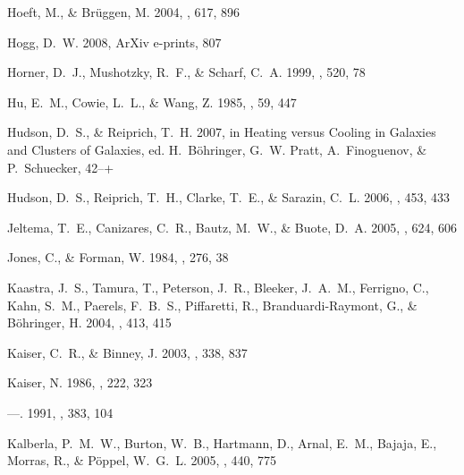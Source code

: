 \documentclass[12pt,preprint]{aastex}
\begin{document}
\begin{thebibliography}{137}
{Hoeft}, M., \& {Br{\"u}ggen}, M. 2004, \apj, 617, 896

{Hogg}, D.~W. 2008, ArXiv e-prints, 807

{Horner}, D.~J., {Mushotzky}, R.~F., \& {Scharf}, C.~A. 1999, \apj, 520, 78

{Hu}, E.~M., {Cowie}, L.~L., \& {Wang}, Z. 1985, \apjs, 59, 447

{Hudson}, D.~S., \& {Reiprich}, T.~H. 2007, in Heating versus Cooling in
  Galaxies and Clusters of Galaxies, ed. H.~{B{\"o}hringer}, G.~W. {Pratt},
  A.~{Finoguenov}, \& P.~{Schuecker}, 42--+

{Hudson}, D.~S., {Reiprich}, T.~H., {Clarke}, T.~E., \& {Sarazin}, C.~L. 2006,
  \aap, 453, 433

{Jeltema}, T.~E., {Canizares}, C.~R., {Bautz}, M.~W., \& {Buote}, D.~A. 2005,
  \apj, 624, 606

{Jones}, C., \& {Forman}, W. 1984, \apj, 276, 38

{Kaastra}, J.~S., {Tamura}, T., {Peterson}, J.~R., {Bleeker}, J.~A.~M.,
  {Ferrigno}, C., {Kahn}, S.~M., {Paerels}, F.~B.~S., {Piffaretti}, R.,
  {Branduardi-Raymont}, G., \& {B{\" o}hringer}, H. 2004, \aap, 413, 415

{Kaiser}, C.~R., \& {Binney}, J. 2003, \mnras, 338, 837

{Kaiser}, N. 1986, \mnras, 222, 323

---. 1991, \apj, 383, 104

{Kalberla}, P.~M.~W., {Burton}, W.~B., {Hartmann}, D., {Arnal}, E.~M.,
  {Bajaja}, E., {Morras}, R., \& {P{\"o}ppel}, W.~G.~L. 2005, \aap, 440, 775


\end{thebibliography}
\end{document}
